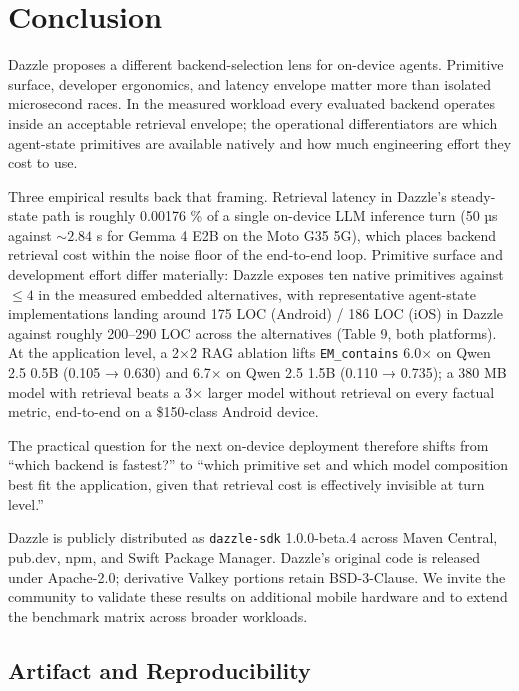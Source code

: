 \section{Conclusion}\label{conclusion}

Dazzle proposes a different backend-selection lens for on-device agents.
Primitive surface, developer ergonomics, and latency envelope matter more than
isolated microsecond races. In the measured workload every evaluated backend
operates inside an acceptable retrieval envelope; the operational
differentiators are which agent-state primitives are available natively and how
much engineering effort they cost to use.

Three empirical results back that framing. Retrieval latency in Dazzle's
steady-state path is roughly 0.00176 \% of a single on-device LLM inference turn
(50 µs against \(\sim 2.84\) s for Gemma 4 E2B on the Moto G35 5G), which places
backend retrieval cost within the noise floor of the end-to-end loop. Primitive
surface and development effort differ materially: Dazzle exposes ten native
primitives against \(\leq 4\) in the measured embedded alternatives, with
representative agent-state implementations landing around 175 LOC (Android) /
186 LOC (iOS) in Dazzle against roughly 200--290 LOC across the alternatives
(Table 9, both platforms). At the application level, a 2×2 RAG ablation lifts
\texttt{EM\_contains} 6.0× on Qwen 2.5 0.5B (0.105 → 0.630) and 6.7× on Qwen 2.5
1.5B (0.110 → 0.735); a 380 MB model with retrieval beats a 3× larger model
without retrieval on every factual metric, end-to-end on a \$150-class Android
device.

The practical question for the next on-device deployment therefore shifts from
``which backend is fastest?'' to ``which primitive set and which model
composition best fit the application, given that retrieval cost is effectively
invisible at turn level.''

Dazzle is publicly distributed as \texttt{dazzle-sdk} 1.0.0-beta.4 across Maven
Central, pub.dev, npm, and Swift Package Manager. Dazzle's original code is
released under Apache-2.0; derivative Valkey portions retain BSD-3-Clause. We
invite the community to validate these results on additional mobile hardware and
to extend the benchmark matrix across broader workloads.

\subsection{Artifact and Reproducibility}\label{artifact-and-reproducibility}

